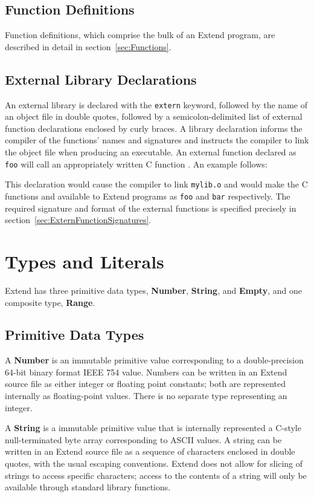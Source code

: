 	\subsection{Function Definitions}
		Function definitions, which comprise the bulk of an Extend program, are described in detail in section~\ref{sec:Functions}.
	\subsection{External Library Declarations}
	  An external library is declared with the \texttt{extern} keyword, followed by the name of an object file in double quotes, followed by a semicolon-delimited list of external function declarations enclosed by curly braces. A library declaration informs the compiler of the functions' names and signatures and instructs the compiler to link the
		object file when producing an executable. An external function declared as \texttt{foo} will call an appropriately written C function \texttt{}. An example follows:
		
		This declaration would cause the compiler to link \texttt{mylib.o} and would make the C functions \texttt{} and \texttt{} available to Extend programs as \texttt{foo} and \texttt{bar} respectively. The required signature and format of the external functions is specified precisely in section~\ref{sec:ExternFunctionSignatures}.
\section{Types and Literals}
		Extend has three primitive data types, \textbf{Number}, \textbf{String}, and \textbf{Empty}, and one composite type, \textbf{Range}.
	\subsection{Primitive Data Types}
		A \textbf{Number} is an immutable primitive value corresponding to a double-precision 64-bit binary format IEEE 754 value. Numbers can be written in an Extend source file as either integer or floating point constants; both are represented internally as floating-point values. There is no separate type representing an integer.

		A \textbf{String} is a immutable primitive value that is internally represented a C-style null-terminated byte array corresponding to ASCII values. A string can be written in an Extend source file as a sequence of characters enclosed in double quotes, with the usual escaping conventions. Extend does not allow for slicing of strings to access specific characters; access to the contents of a string will only be available through standard library functions.

